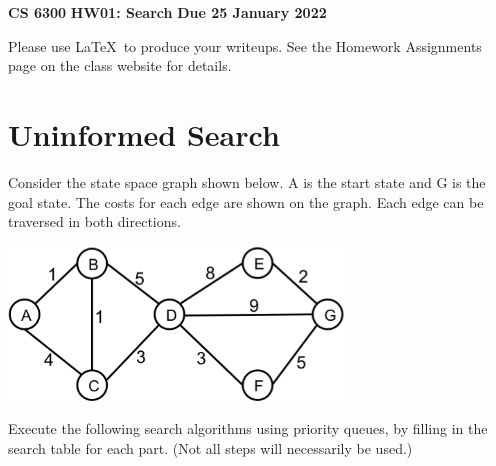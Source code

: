 \documentclass[11pt]{article}
\begin{document}
\thispagestyle{empty}

\begin{center}
{\bf CS 6300} \hfill {\large\bf HW01:  Search} \hfill {\bf Due 25 January 2022}
\end{center}

Please use \LaTeX\ to produce your writeups. See the Homework Assignments 
page on the class website for details.

\section{Uninformed Search}

Consider the state space graph shown below.  A is the start state and
G is the goal state. The costs for each edge are shown on the graph.
Each edge can be traversed in both directions.

\begin{center}
\includegraphics[width=3.5in]{search_graph.eps}
\end{center}

Execute the following search algorithms using priority queues, by
filling in the search table for each part.  (Not all steps will
necessarily be used.)
\end{document}
